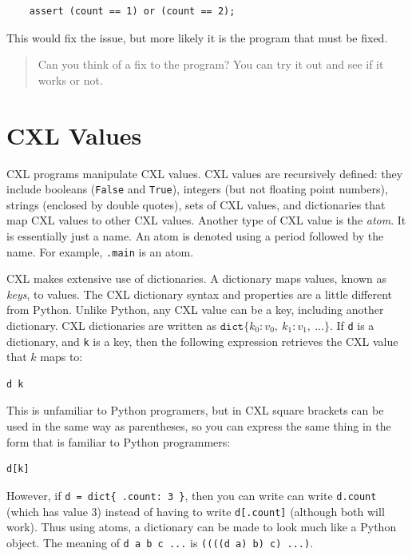 \documentclass{report}
\newenvironment{code}{
\tcolorbox
}{
\endtcolorbox
}
\begin{document}
\begin{code}
\begin{verbatim}
    assert (count == 1) or (count == 2);
\end{verbatim}
\end{code}

This would fix the issue, but more likely it is the program that must
be fixed.

\begin{quote}
Can you think of a fix to the program?  You can try it out and see
if it works or not.
\end{quote}

\chapter{CXL Values}
\label{ch:cxlvalues}

CXL programs manipulate CXL values.
CXL values are recursively defined:
they include booleans (\texttt{False} and \texttt{True}),
integers (but not floating point numbers),
strings (enclosed by double quotes),
sets of CXL values,
and dictionaries that map CXL values to other CXL values.
%
Another type of CXL value is the \emph{atom}.  It is essentially
just a name.  An atom is denoted using a period followed by the
name.  For example, \texttt{.main} is an atom.

CXL makes extensive use of dictionaries.
A dictionary maps values, known as \emph{keys}, to values.
The CXL dictionary syntax and properties are a little different from Python.
Unlike Python, any CXL value can be a key, including another
dictionary.
CXL dictionaries are written as
$\mathtt{dict}\{ k_0: v_0, ~ k_1: v_1, ~ ... \}$.
If \texttt{d} is a dictionary, and \texttt{k} is a key, then the
following expression retrieves the CXL value that $k$ maps to:
\begin{code}
\begin{verbatim}
d k
\end{verbatim}
\end{code}
This is unfamiliar to Python programers, but in CXL square brackets can be used
in the same way as parentheses, so you can express the same thing in the form
that is familiar to Python programmers:
\begin{code}
\begin{verbatim}
d[k]
\end{verbatim}
\end{code}
However, if \texttt{d = dict\{ .count: 3 \}}, then you can write
can write \texttt{d.count} (which has value 3) instead of having to write
\texttt{d[.count]} (although both will work).
Thus using atoms, a dictionary can be made to look much like a Python object.
The meaning of \texttt{d a b c ...} is \texttt{((((d a) b) c) ...)}.
\end{document}

